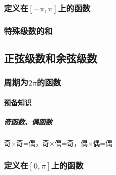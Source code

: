 \documentclass[UTF8,a4paper,12pt,scheme=chinese]{ctexbook}
\theoremstyle{plain}
\begin{document}
	\subsubsection{定义在$[-\pi,\pi]$上的函数}
	\subsubsection{特殊级数的和}
	\subsection{正弦级数和余弦级数}
	\subsubsection{周期为$2\pi$的函数}
	\paragraph{预备知识}
	\subparagraph{奇函数、偶函数}奇$\times$奇=偶，奇$\times$偶=奇，偶$\times$偶=偶
	\subsubsection{定义在$[0,\pi]$上的函数}
\end{document}
